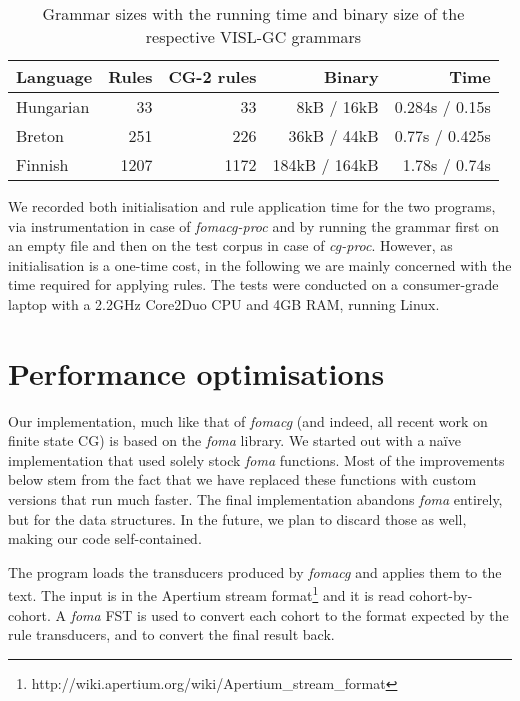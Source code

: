 \documentclass[11pt]{article}
\begin{document}
\begin{table*}[h]
  \centering
  \caption{Grammar sizes with the running time and binary size of the respective
           VISL-GC grammars}
  \label{tab:grammar_size}
  \begin{tabular}{ | l | r | r | r | r | }
  \hline
  \textbf{Language} & \textbf{Rules} & \textbf{CG-2 rules} &
  \textbf{Binary} & \textbf{Time} \\
  \hline
  Hungarian &   33 &   33 &   8kB / 16kB & 0.284s / 0.15s \\
  Breton    &  251 &  226 &  36kB / 44kB & 0.77s / 0.425s \\
  Finnish   & 1207 & 1172 & 184kB / 164kB & 1.78s / 0.74s \\
  \hline
  \end{tabular}
\end{table*}

We recorded both initialisation and rule application time for the two programs,
via instrumentation in case of \emph{fomacg-proc} and by running the grammar
first on an empty file and then on the test corpus in case of \emph{cg-proc}.
However, as initialisation is a one-time cost, in the following we are mainly
concerned with the time required for applying rules. The tests were conducted on
a consumer-grade laptop with a 2.2GHz Core2Duo CPU and 4GB RAM, running Linux.

\section{Performance optimisations}
\label{sec:speed}

Our implementation, much like that of \emph{fomacg} (and indeed, all recent
work on finite state CG) is based on the \emph{foma} library. We started out
with a naïve implementation that used solely stock \emph{foma} functions. Most
of the improvements below stem from the fact that we have replaced these
functions with custom versions that run much faster. The final implementation
abandons \emph{foma} entirely, but for the data structures. In the future, we
plan to discard those as well, making our code self-contained.

The program loads the transducers produced by \emph{fomacg} and applies them
to the text. The input is in the Apertium stream
format\footnote{http://wiki.apertium.org/wiki/Apertium\_stream\_format}
and it is read cohort-by-cohort. A \emph{foma} FST is used to convert each
cohort to the format expected by the rule transducers, and to convert the final
result back.
\end{document}

